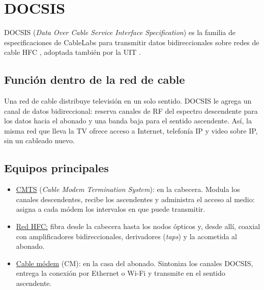 \section{DOCSIS}
\label{sec:docsis}

DOCSIS (\textit{Data Over Cable Service Interface Specification}) es la familia de especificaciones de CableLabs para transmitir datos bidireccionales sobre redes de cable HFC \cite{docsis31, docsis40}, adoptada también por la UIT \cite{itu_j222}.

\subsection{Función dentro de la red de cable}
Una red de cable distribuye televisión en un solo sentido. DOCSIS le agrega un canal de datos bidireccional: reserva canales de RF del espectro descendente para los datos hacia el abonado y una banda baja para el sentido ascendente. Así, la misma red que lleva la TV ofrece acceso a Internet, telefonía IP y video sobre IP, sin un cableado nuevo.

\subsection{Equipos principales}
\begin{itemize}
    \item \underline{CMTS} (\textit{Cable Modem Termination System}): en la cabecera. Modula los canales descendentes, recibe los ascendentes y administra el acceso al medio: asigna a cada módem los intervalos en que puede transmitir.
    \item \underline{Red HFC:} fibra desde la cabecera hasta los nodos ópticos y, desde allí, coaxial con amplificadores bidireccionales, derivadores (\textit{taps}) y la acometida al abonado.
    \item \underline{Cable módem} (CM): en la casa del abonado. Sintoniza los canales DOCSIS, entrega la conexión por Ethernet o Wi-Fi y transmite en el sentido ascendente.
\end{itemize}

